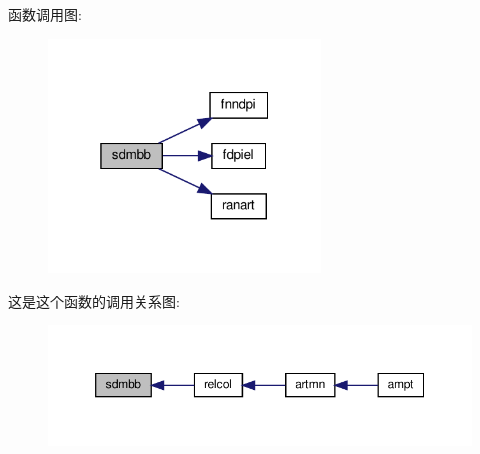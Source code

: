函数调用图\+:
\nopagebreak
\begin{figure}[H]
\begin{center}
\leavevmode
\includegraphics[width=205pt]{sdmbb_8f90_a09c6069770f7fe9d9f7549d9d60c531c_cgraph}
\end{center}
\end{figure}
这是这个函数的调用关系图\+:
\nopagebreak
\begin{figure}[H]
\begin{center}
\leavevmode
\includegraphics[width=350pt]{sdmbb_8f90_a09c6069770f7fe9d9f7549d9d60c531c_icgraph}
\end{center}
\end{figure}
